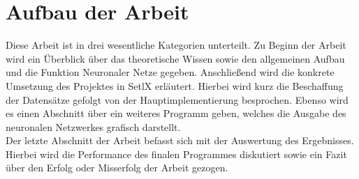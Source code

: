 \section{Aufbau der Arbeit}
Diese Arbeit ist in drei wesentliche Kategorien unterteilt. Zu Beginn der Arbeit wird ein Überblick über das theoretische Wissen sowie den allgemeinen Aufbau und die Funktion Neuronaler Netze gegeben. Anschließend wird die konkrete Umsetzung des Projektes in SetlX erläutert. Hierbei wird kurz die Beschaffung der Datensätze gefolgt von der Hauptimplementierung besprochen. Ebenso wird es einen Abschnitt über ein weiteres Programm geben, welches die Ausgabe des neuronalen Netzwerkes grafisch darstellt. \\
Der letzte Abschnitt der Arbeit befasst sich mit der Auswertung des Ergebnisses. Hierbei wird die Performance des finalen Programmes diskutiert sowie ein Fazit über den Erfolg oder Misserfolg der Arbeit gezogen.
